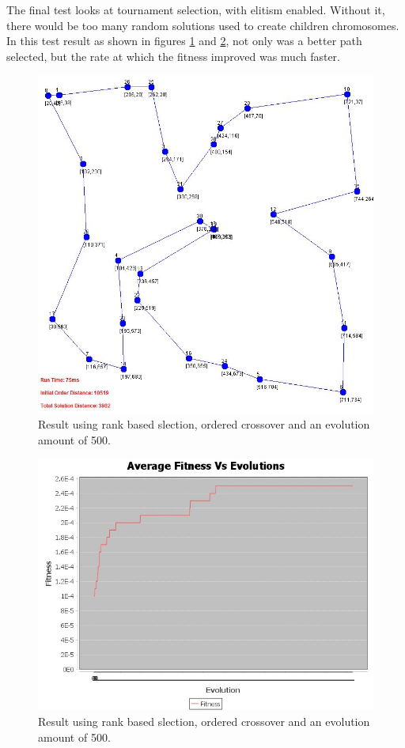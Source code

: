\documentclass[article]{IEEEtran}
\begin{document}
The final test looks at tournament selection, with elitism enabled. Without it, there would be too many random solutions used to create children chromosomes. In this test result as shown in figures \ref{fig:18} and \ref{fig:19}, not only was a better path selected, but the rate at which the fitness improved was much faster.

\begin{figure}[H]
\centering
  \includegraphics[width=.8\linewidth]{images/test3}
  \caption{Result using rank based slection, ordered crossover and an evolution amount of 500.}
  \label{fig:18}
\end{figure}

\begin{figure}[H]
\centering
  \includegraphics[width=.8\linewidth]{images/averageFitnesses3}
  \caption{Result using rank based slection, ordered crossover and an evolution amount of 500.}
  \label{fig:19}
\end{figure}
\end{document}
